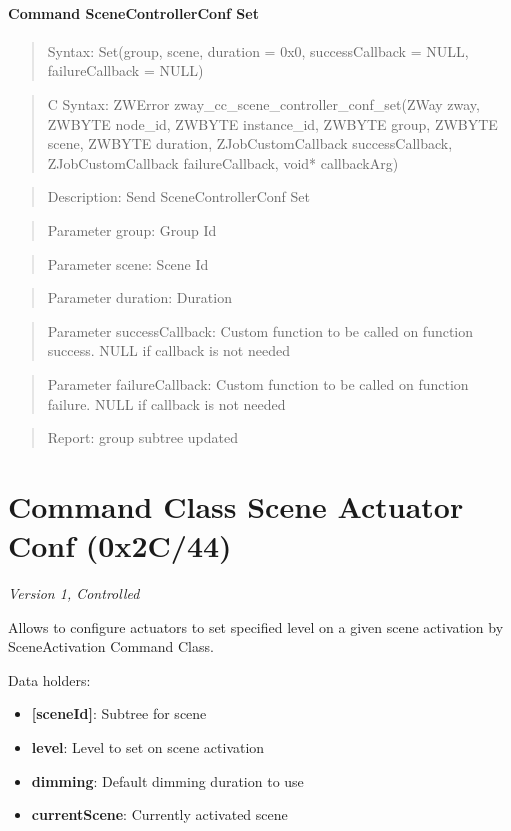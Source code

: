 \paragraph{Command SceneControllerConf Set}
\begin{quote}Syntax: Set(group, scene, duration = 0x0, successCallback = NULL, failureCallback = NULL)\end{quote}
\begin{quote}C Syntax: ZWError zway\_cc\_scene\_controller\_conf\_set(ZWay zway, ZWBYTE node\_id, ZWBYTE instance\_id, ZWBYTE group, ZWBYTE scene, ZWBYTE duration, ZJobCustomCallback successCallback, ZJobCustomCallback failureCallback, void* callbackArg)\end{quote}
\begin{quote}Description: Send SceneControllerConf Set\end{quote}
\begin{quote}Parameter group: Group Id\end{quote}
\begin{quote}Parameter scene: Scene Id\end{quote}
\begin{quote}Parameter duration: Duration\end{quote}
\begin{quote}Parameter successCallback: Custom function to be called on function success. NULL if callback is not needed\end{quote}
\begin{quote}Parameter failureCallback: Custom function to be called on function failure. NULL if callback is not needed\end{quote}
\begin{quote}Report: group subtree updated\end{quote}


\section{Command Class Scene Actuator Conf (0x2C/44)}

\textit{Version 1, Controlled}
\newline

Allows to configure actuators to set specified level on a given scene activation by SceneActivation Command Class.
\newline

\noindent
Data holders:

\begin{itemize}
\item \textbf{[sceneId]}: Subtree for scene
\item \qquad\textbf{level}: Level to set on scene activation
\item \qquad\textbf{dimming}: Default dimming duration to use
\item \textbf{currentScene}: Currently activated scene
\end{itemize}

